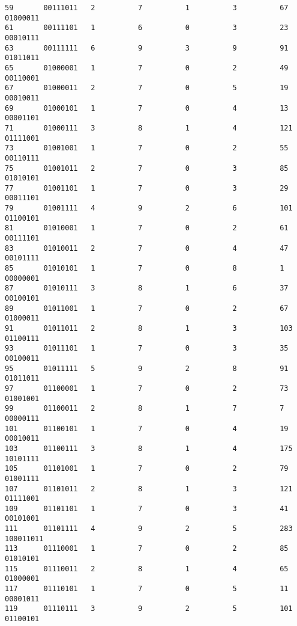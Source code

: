\documentclass[10pt,letterpaper]{article}
\begin{document}
\begin{lstlisting}
59       00111011   2          7          1          3          67       01000011  
61       00111101   1          6          0          3          23       00010111  
63       00111111   6          9          3          9          91       01011011  
65       01000001   1          7          0          2          49       00110001  
67       01000011   2          7          0          5          19       00010011  
69       01000101   1          7          0          4          13       00001101  
71       01000111   3          8          1          4          121      01111001  
73       01001001   1          7          0          2          55       00110111  
75       01001011   2          7          0          3          85       01010101  
77       01001101   1          7          0          3          29       00011101  
79       01001111   4          9          2          6          101      01100101  
81       01010001   1          7          0          2          61       00111101  
83       01010011   2          7          0          4          47       00101111  
85       01010101   1          7          0          8          1        00000001  
87       01010111   3          8          1          6          37       00100101  
89       01011001   1          7          0          2          67       01000011  
91       01011011   2          8          1          3          103      01100111  
93       01011101   1          7          0          3          35       00100011  
95       01011111   5          9          2          8          91       01011011  
97       01100001   1          7          0          2          73       01001001  
99       01100011   2          8          1          7          7        00000111  
101      01100101   1          7          0          4          19       00010011  
103      01100111   3          8          1          4          175      10101111  
105      01101001   1          7          0          2          79       01001111  
107      01101011   2          8          1          3          121      01111001  
109      01101101   1          7          0          3          41       00101001  
111      01101111   4          9          2          5          283      100011011 
113      01110001   1          7          0          2          85       01010101  
115      01110011   2          8          1          4          65       01000001  
117      01110101   1          7          0          5          11       00001011  
119      01110111   3          9          2          5          101      01100101  

\end{lstlisting}
\end{document}
